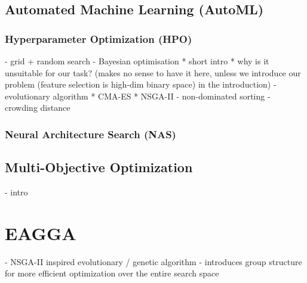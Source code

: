 \documentclass[twoside,11pt]{article}
\begin{document}
\subsection{Automated Machine Learning (AutoML)}
\subsubsection{Hyperparameter Optimization (HPO)}
- grid + random search
- Bayesian optimisation
  * short intro
  * why is it unsuitable for our task? (makes no sense to have it here, unless we introduce our problem (feature selection is high-dim binary space) in the introduction)
- evolutionary algorithm
  * CMA-ES
  * NSGA-II
    - non-dominated sorting
    - crowding distance
\subsubsection{Neural Architecture Search (NAS)}

\subsection{Multi-Objective Optimization}
- intro


\section{EAGGA}
- NSGA-II inspired evolutionary / genetic algorithm
- introduces group structure for more efficient optimization over the entire search space
\end{document}
